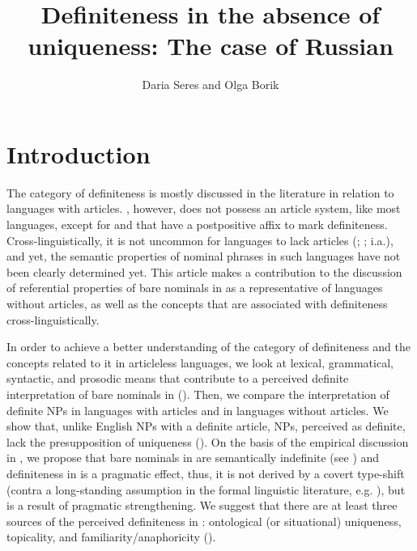 \documentclass[output=paper,
colorlinks,
citecolor=brown,
newtxmath
]{langscibook}
\author{Daria Seres\orcid{0000-0002-9044-8516}\affiliation{Universitat Autònoma de Barcelona (UAB)} and Olga Borik\orcid{0000-0003-1255-5962}\affiliation{Universidad Nacional de Educación a Distancia (UNED)}}
\title{Definiteness in the absence of uniqueness: The case of Russian}
\begin{document}
\maketitle


\section{Introduction} \label{sec:seres:intro}
The category of definiteness is mostly discussed in the literature in relation to languages with articles. , however, does not possess an article system, like most  languages, except for  and  that have a postpositive affix to mark definiteness. Cross-linguistically, it is not uncommon for languages to lack articles (\citealt{Lyons1999}; %
\citealt{Dryer2013}; %
i.a.), and yet, the semantic properties of nominal phrases in such languages have not been clearly determined yet. This article makes a contribution to the discussion of referential properties of bare nominals in  as a representative of languages without articles, as well as the concepts that are associated with definiteness cross-linguistically. %

In order to achieve a better understanding of the category of definiteness and the concepts related to it in articleless languages, we look at lexical, grammatical, syntactic, and prosodic means that contribute to a perceived definite interpretation of bare nominals in  (). Then, we compare the interpretation of definite NPs in languages with articles and in languages without articles. %
We show that, unlike English NPs with a definite article,  NPs, perceived as definite, lack the presupposition of uniqueness (). On the basis of the empirical discussion in , we propose that bare nominals in  are semantically indefinite (see \citealt{Heim2011}) and definiteness in  is a pragmatic effect, thus, it is not derived by a covert type-shift (contra a long-standing assumption in the formal linguistic literature, e.g. \citealt{Chierchia1998}), but is a result of pragmatic strengthening. We suggest that there are at least three sources of the perceived definiteness in : ontological (or situational) uniqueness, topicality, and familiarity/anaphoricity ().
\end{document}
